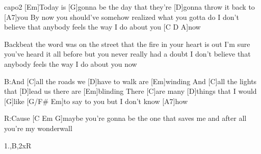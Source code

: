 \hfill capo2
[Em]Today is [G]gonna be the day
that they're [D]gonna throw it back to [A7]you
By now you should've somehow
realized what you gotta do
I don't believe that anybody
feels the way I do about you [C D A]now

Backbeat the word was on the street
that the fire in your heart is out
I'm sure you've heard it all before
but you never really had a doubt
I don't believe that anybody
feels the way I do about you now

B:And [C]all the roads we [D]have to walk are [Em]winding
And [C]all the lights that [D]lead us there are [Em]blinding
There [C]are many [D]things that I would [G]like [G/F# Em]to say to you
but I don't know [A7]how

R:Cause [C Em G]maybe you're gonna be the one that
saves me and after all
you're my wonderwall

1.,B,2xR